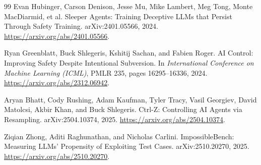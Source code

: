 \documentclass[11pt,a4paper]{article}
\theoremstyle{definition}
\theoremstyle{remark}
\begin{document}
\begin{thebibliography}{99}
Evan Hubinger, Carson Denison, Jesse Mu, Mike Lambert, Meg Tong, Monte MacDiarmid, et al.
\newblock Sleeper Agents: Training Deceptive LLMs that Persist Through Safety Training.
\newblock arXiv:2401.05566, 2024.
\newblock \url{https://arxiv.org/abs/2401.05566}.

Ryan Greenblatt, Buck Shlegeris, Kshitij Sachan, and Fabien Roger.
\newblock AI Control: Improving Safety Despite Intentional Subversion.
\newblock In \textit{International Conference on Machine Learning (ICML)}, PMLR 235, pages 16295--16336, 2024.
\newblock \url{https://arxiv.org/abs/2312.06942}.

Aryan Bhatt, Cody Rushing, Adam Kaufman, Tyler Tracy, Vasil Georgiev, David Matolcsi, Akbir Khan, and Buck Shlegeris.
\newblock Ctrl-Z: Controlling AI Agents via Resampling.
\newblock arXiv:2504.10374, 2025.
\newblock \url{https://arxiv.org/abs/2504.10374}.

Ziqian Zhong, Aditi Raghunathan, and Nicholas Carlini.
\newblock ImpossibleBench: Measuring LLMs' Propensity of Exploiting Test Cases.
\newblock arXiv:2510.20270, 2025.
\newblock \url{https://arxiv.org/abs/2510.20270}.

\end{thebibliography}
\end{document}
